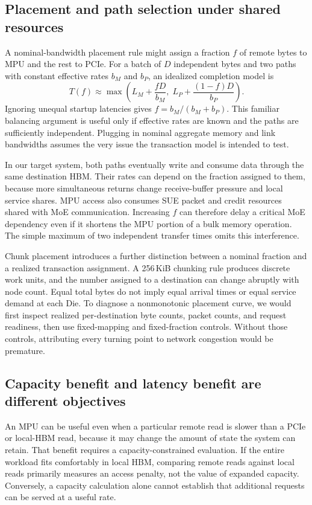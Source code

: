 \subsection{Placement and path selection under shared resources}
A nominal-bandwidth placement rule might assign a fraction $f$ of remote bytes to MPU and the rest to PCIe. For a batch of $D$ independent bytes and two paths with constant effective rates $b_M$ and $b_P$, an idealized completion model is
\begin{equation}
 T(f)\approx\max\left(L_M+\frac{fD}{b_M},\;L_P+\frac{(1-f)D}{b_P}\right).
\end{equation}
Ignoring unequal startup latencies gives $f=b_M/(b_M+b_P)$. This familiar balancing argument is useful only if effective rates are known and the paths are sufficiently independent. Plugging in nominal aggregate memory and link bandwidths assumes the very issue the transaction model is intended to test.

In our target system, both paths eventually write and consume data through the same destination HBM. Their rates can depend on the fraction assigned to them, because more simultaneous returns change receive-buffer pressure and local service shares. MPU access also consumes SUE packet and credit resources shared with MoE communication. Increasing $f$ can therefore delay a critical MoE dependency even if it shortens the MPU portion of a bulk memory operation. The simple maximum of two independent transfer times omits this interference.

Chunk placement introduces a further distinction between a nominal fraction and a realized transaction assignment. A 256\,KiB chunking rule produces discrete work units, and the number assigned to a destination can change abruptly with node count. Equal total bytes do not imply equal arrival times or equal service demand at each Die. To diagnose a nonmonotonic placement curve, we would first inspect realized per-destination byte counts, packet counts, and request readiness, then use fixed-mapping and fixed-fraction controls. Without those controls, attributing every turning point to network congestion would be premature.

\subsection{Capacity benefit and latency benefit are different objectives}
An MPU can be useful even when a particular remote read is slower than a PCIe or local-HBM read, because it may change the amount of state the system can retain. That benefit requires a capacity-constrained evaluation. If the entire workload fits comfortably in local HBM, comparing remote reads against local reads primarily measures an access penalty, not the value of expanded capacity. Conversely, a capacity calculation alone cannot establish that additional requests can be served at a useful rate.

